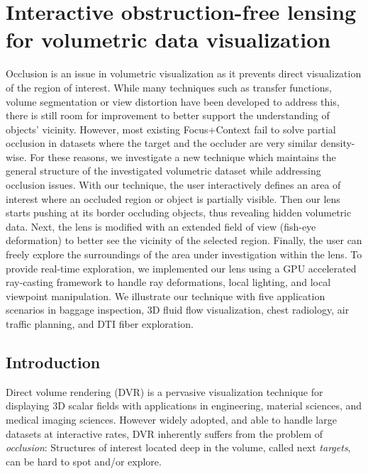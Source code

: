 \chapter{Interactive obstruction-free lensing for volumetric data visualization}

Occlusion is an issue in volumetric visualization as it prevents direct visualization of the region of interest. While many techniques such as transfer functions, volume segmentation or view distortion have been developed to address this, there is still room for improvement to better support the understanding of objects' vicinity. However, most existing Focus+Context fail to solve partial occlusion in datasets where the target and the occluder are very similar density-wise. For these reasons, we investigate a new technique which maintains the general structure of the investigated volumetric dataset while addressing occlusion issues. With our technique, the user interactively defines an area of interest where an occluded region or object is partially visible. Then our lens starts pushing at its border occluding objects, thus revealing hidden volumetric data. Next, the lens is modified with an extended field of view (fish-eye deformation) to better see the vicinity of the selected region. Finally, the user can freely explore the surroundings of the area under investigation within the lens. To provide real-time exploration, we implemented our lens using a GPU accelerated ray-casting framework
to handle ray deformations, local lighting, and local viewpoint manipulation. We illustrate our technique with five application scenarios in baggage inspection, 3D fluid flow visualization, chest radiology, air traffic planning, and DTI fiber exploration.

\section{Introduction}
Direct volume rendering (DVR) is a pervasive visualization technique for displaying 3D scalar fields with applications in engineering, material sciences, and medical imaging sciences. However widely adopted, and able to handle large datasets at interactive rates, DVR inherently suffers from the problem of \emph{occlusion}: Structures of interest located deep in the volume, called next \emph{targets}, can be hard to spot and/or explore.

